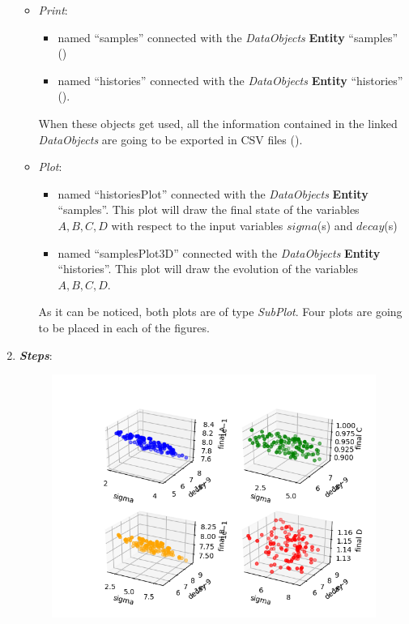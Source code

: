 \begin{enumerate}
  \begin{itemize}
    \item \textit{Print}:
     \begin{itemize}
       \item named ``samples'' connected with the \textit{DataObjects} \textbf{Entity} ``samples''
                ()
       \item named ``histories'' connected with the \textit{DataObjects} \textbf{Entity} ``histories'' ().
     \end{itemize}
      When these objects get used, all the information contained in the
      linked  \textit{DataObjects} are going
    to be exported in CSV files ().
    \item \textit{Plot}:
    \begin{itemize}
      \item named ``historiesPlot'' connected with the  \textit{DataObjects}
      \textbf{Entity} ``samples''.  This plot will draw the final state of the
      variables $A,B,C,D$ with respect to the input variables $sigma$(s)
      and $decay$(s)
      \item named ``samplesPlot3D'' connected with the
      \textit{DataObjects} \textbf{Entity} ``histories''. This plot will draw the
      evolution of the variables $A,B,C,D$.
    \end{itemize}
     As it can be noticed, both plots are of type \textit{SubPlot}. Four plots
     are going to be placed in each of the figures.
  \end{itemize}
   \item \textbf{\textit{Steps}}:
 \begin{figure}[h!]
  \centering
  \includegraphics[scale=0.7]{../../tests/framework/user_guide/ForwardSamplingStrategies/gold/RunDir/Stratified/1-samplesPlot3D_scatter-scatter-scatter-scatter.png}

\end{figure}
\end{enumerate}
